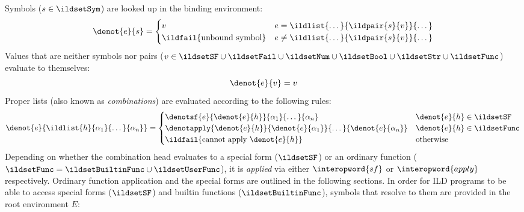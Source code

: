 Symbols (\( s \in \ildsetSym \)) are looked up in the binding environment:
\begin{equation}\label{eq-lookup}
  \denot{e}{s} = \begin{cases}
      v & e = \ildlist{\dots}{\ildpair{s}{v}}{\dots} \\
      \ildfail{\text{unbound symbol}} & e \neq \ildlist{\dots}{\ildpair{s}{v}}{\dots} \\
    \end{cases}
\end{equation}
Values that are neither symbols nor pairs (\(v \in \ildsetSF \cup \ildsetFail \cup \ildsetNum \cup \ildsetBool \cup \ildsetStr \cup \ildsetFunc\))
evaluate to themselves:
\begin{equation}
  \denot{e}{v} = v
\end{equation}
Proper lists (also known as \emph{combinations}) are evaluated according to the following rules:
\begin{equation}
  \begin{gathered}
  \denot{e}{\ildlist{h}{\alpha_1}{\dots}{\alpha_n}}
  = \begin{cases}
      \denotsf{e}{\denot{e}{h}}{\alpha_1}{\dots}{\alpha_n} & \denot{e}{h} \in \ildsetSF \\
      \denotapply{\denot{e}{h}}{\denot{e}{\alpha_1}}{\dots}{\denot{e}{\alpha_n}} & \denot{e}{h} \in \ildsetFunc \\
      \ildfail{\text{cannot apply }\denot{e}{h}} & \text{otherwise} \\
    \end{cases}
  \end{gathered}
\end{equation}
Depending on whether the combination head evaluates to a special form (\(\ildsetSF\))
or an ordinary function (\(\ildsetFunc = \ildsetBuiltinFunc \cup \ildsetUserFunc \)),
it is \emph{applied} via either \(\interopword{sf}\) or \(\interopword{apply}\) respectively.
Ordinary function application and the special forms are outlined in the following sections.
In order for ILD programs to be able to access special forms (\(\ildsetSF\)) and builtin functions
(\(\ildsetBuiltinFunc\)), symbols that resolve to them are provided in the root environment \(E\):
